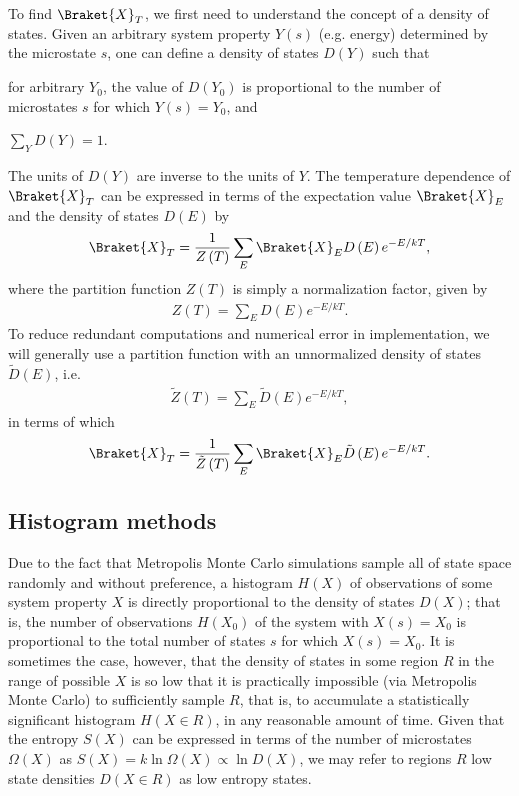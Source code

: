 \documentclass[11pt]{article}
\newcommand{\bk}{\Braket} %
\newcommand{\f}[2]{\dfrac{#1}{#2}} %
\newcommand{\p}[1]{\left(#1\right)} %
\begin{document}
To find $\bk{X}_T$, we first need to understand the concept of a
density of states. Given an arbitrary system property $Y\p{s}$
(e.g. energy) determined by the microstate $s$, one can define a
density of states $D\p{Y}$ such that
\begin{enumerate*}[label=\roman*)]
\item for arbitrary $Y_0$, the value of $D\p{Y_0}$ is proportional to
  the number of microstates $s$ for which $Y\p{s}=Y_0$, and
\item $\sum_YD\p{Y}=1$.
\end{enumerate*}
The units of $D\p{Y}$ are inverse to the units of $Y$. The temperature
dependence of $\bk{X}_T$ can be expressed in terms of the expectation
value $\bk{X}_E$ and the density of states $D\p{E}$ by
\begin{align}
  \bk{X}_T=\f1{Z\p{T}}\sum_E\bk{X}_ED\p{E}e^{-E/kT},
  \label{eq:XT_norm}
\end{align}
where the partition function $Z\p{T}$ is simply a normalization
factor, given by
\begin{align}
  Z\p{T}=\sum_ED\p{E}e^{-E/kT}.
\end{align}
To reduce redundant computations and numerical error in
implementation, we will generally use a partition function with an
unnormalized density of states $\tilde D\p{E}$, i.e.
\begin{align}
  \tilde Z\p{T}=\sum_E\tilde D\p{E}e^{-E/kT},
\end{align}
in terms of which
\begin{align}
  \bk{X}_T=\f1{\tilde Z\p{T}}\sum_E\bk{X}_E\tilde D\p{E}e^{-E/kT}.
  \label{eq:XT}
\end{align}

\subsection{Histogram methods}
\label{sec:histogram_methods}

Due to the fact that Metropolis Monte Carlo simulations sample all of
state space randomly and without preference, a histogram $H\p{X}$ of
observations of some system property $X$ is directly proportional to
the density of states $D\p{X}$; that is, the number of observations
$H\p{X_0}$ of the system with $X\p{s}=X_0$ is proportional to the
total number of states $s$ for which $X\p{s}=X_0$. It is sometimes the
case, however, that the density of states in some region $R$ in the
range of possible $X$ is so low that it is practically impossible (via
Metropolis Monte Carlo) to sufficiently sample $R$, that is, to
accumulate a statistically significant histogram $H\p{X\in R}$, in any
reasonable amount of time. Given that the entropy $S\p{X}$ can be
expressed in terms of the number of microstates $\Omega\p{X}$ as
$S\p{X}=k\ln\Omega\p{X}\propto\ln D\p{X}$, we may refer to regions $R$
low state densities $D\p{X\in R}$ as low entropy states.
\end{document}
